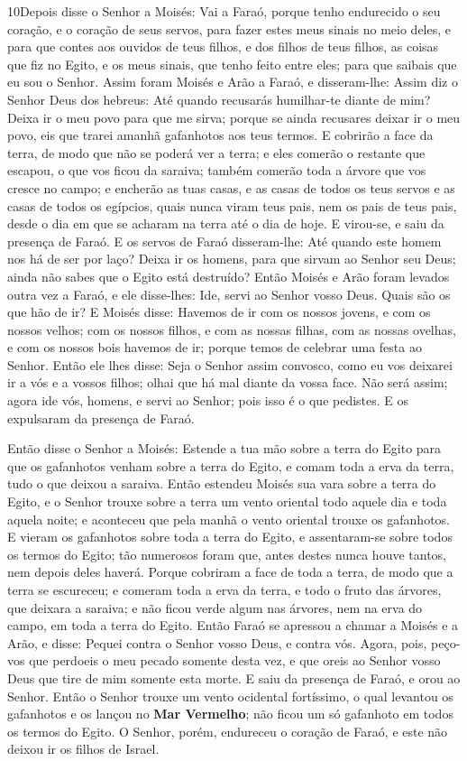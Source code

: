 \lettrine{10} Depois disse o Senhor a Moisés: Vai a Faraó,
porque tenho endurecido o seu coração, e o coração de seus servos,
para fazer estes meus sinais no meio deles, e para que contes
aos ouvidos de teus filhos, e dos filhos de teus filhos, as coisas
que fiz no Egito, e os meus sinais, que tenho feito entre eles; para
que saibais que eu sou o Senhor. Assim foram Moisés e Arão a
Faraó, e disseram-lhe: Assim diz o Senhor Deus dos hebreus: Até
quando recusarás humilhar-te diante de mim? Deixa ir o meu povo para
que me sirva; porque se ainda recusares deixar ir o meu povo,
eis que trarei amanhã gafanhotos aos teus termos. E cobrirão a
face da terra, de modo que não se poderá ver a terra; e eles comerão
o restante que escapou, o que vos ficou da saraiva; também comerão
toda a árvore que vos cresce no campo; e encherão as tuas casas,
e as casas de todos os teus servos e as casas de todos os egípcios,
quais nunca viram teus pais, nem os pais de teus pais, desde o dia
em que se acharam na terra até o dia de hoje. E virou-se, e saiu da
presença de Faraó. E os servos de Faraó disseram-lhe: Até quando
este homem nos há de ser por laço? Deixa ir os homens, para que
sirvam ao Senhor seu Deus; ainda não sabes que o Egito está
destruído? Então Moisés e Arão foram levados outra vez a Faraó,
e ele disse-lhes: Ide, servi ao Senhor vosso Deus. Quais são os que
hão de ir? E Moisés disse: Havemos de ir com os nossos jovens, e
com os nossos velhos; com os nossos filhos, e com as nossas filhas,
com as nossas ovelhas, e com os nossos bois havemos de ir; porque
temos de celebrar uma festa ao Senhor. Então ele lhes disse:
Seja o Senhor assim convosco, como eu vos deixarei ir a vós e a
vossos filhos; olhai que há mal diante da vossa face. Não
será assim; agora ide vós, homens, e servi ao Senhor; pois isso é o
que pedistes. E os expulsaram da presença de Faraó.

Então disse o Senhor a Moisés: Estende a tua mão sobre a terra do
Egito para que os gafanhotos venham sobre a terra do Egito, e comam
toda a erva da terra, tudo o que deixou a saraiva. Então
estendeu Moisés sua vara sobre a terra do Egito, e o Senhor trouxe
sobre a terra um vento oriental todo aquele dia e toda aquela noite;
e aconteceu que pela manhã o vento oriental trouxe os gafanhotos.
E vieram os gafanhotos sobre toda a terra do Egito, e
assentaram-se sobre todos os termos do Egito; tão numerosos foram
que, antes destes nunca houve tantos, nem depois deles haverá.
Porque cobriram a face de toda a terra, de modo que a terra
se escureceu; e comeram toda a erva da terra, e todo o fruto das
árvores, que deixara a saraiva; e não ficou verde algum nas árvores,
nem na erva do campo, em toda a terra do Egito. Então Faraó
se apressou a chamar a Moisés e a Arão, e disse: Pequei contra o
Senhor vosso Deus, e contra vós. Agora, pois, peço-vos que
perdoeis o meu pecado somente desta vez, e que oreis ao Senhor vosso
Deus que tire de mim somente esta morte. E saiu da presença
de Faraó, e orou ao Senhor. Então o Senhor trouxe um vento
ocidental fortíssimo, o qual levantou os gafanhotos e os lançou no
\textbf{Mar Vermelho}; não ficou um só gafanhoto em todos os termos
do Egito. O Senhor, porém, endureceu o coração de Faraó, e
este não deixou ir os filhos de Israel.

